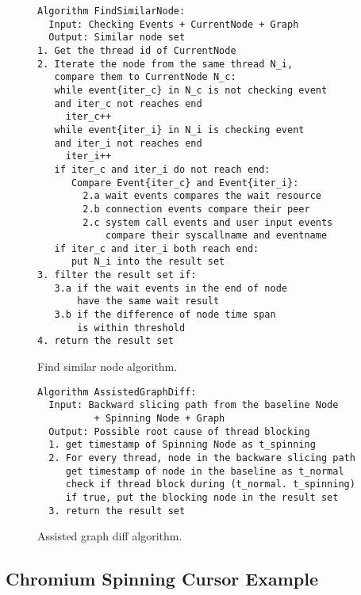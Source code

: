 \begin{figure}[H]
\footnotesize\begin{verbatim}
Algorithm FindSimilarNode:
  Input: Checking Events + CurrentNode + Graph
  Output: Similar node set
1. Get the thread id of CurrentNode
2. Iterate the node from the same thread N_i, 
   compare them to CurrentNode N_c:
   while event{iter_c} in N_c is not checking event
   and iter_c not reaches end
   	 iter_c++
   while event{iter_i} in N_i is checking event
   and iter_i not reaches end
     iter_i++
   if iter_c and iter_i do not reach end:
      Compare Event{iter_c} and Event{iter_i}:
        2.a wait events compares the wait resource
        2.b connection events compare their peer
        2.c system call events and user input events
            compare their syscallname and eventname
   if iter_c and iter_i both reach end:
      put N_i into the result set
3. filter the result set if:
   3.a if the wait events in the end of node
       have the same wait result
   3.b if the difference of node time span
       is within threshold
4. return the result set
\end{verbatim}
    \caption{\xxx Find similar node algorithm.}
    \label{fig:alg-findsimilarnode}
\end{figure}

\begin{figure}[H]
\footnotesize\begin{verbatim}
Algorithm AssistedGraphDiff:
  Input: Backward slicing path from the baseline Node
          + Spinning Node + Graph
  Output: Possible root cause of thread blocking
  1. get timestamp of Spinning Node as t_spinning
  2. For every thread, node in the backware slicing path
     get timestamp of node in the baseline as t_normal
     check if thread block during (t_normal. t_spinning)
     if true, put the blocking node in the result set
  3. return the result set
\end{verbatim}
    \caption{\xxx Assisted graph diff algorithm.}
    \label{fig:alg-graphdiff}
\end{figure}


\subsection{Chromium Spinning Cursor Example}



